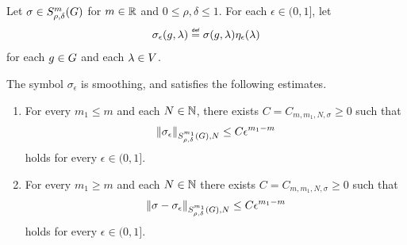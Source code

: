 \begin{corollary}
    Let $\sigma \in \SymbolClass m {\rho, \delta}$ for $m \in \R$ and $0 \leq \rho, \delta \leq 1$.
    For each $\epsilon \in (0, 1]$,
    let
    \begin{align*}
        \sigma_\epsilon(g, \lambda) \defeq \sigma(g, \lambda) \eta_\epsilon(\lambda)
    \end{align*}
    for each $g \in \Group$ and each $\lambda \in \VectorSpace$.

    The symbol $\sigma_\epsilon$ is smoothing,
    and satisfies the following estimates.
    \begin{enumerate}
        \item For every $m_1 \leq m$ and each $N \in \N$,
            there exists $C = C_{m, m_1, N, \sigma} \geq 0$ such that
            \begin{align*}
                \SymbolSemiNorm {m_1} {\rho, \delta} N {\sigma_\epsilon}
                \leq C \epsilon^{m_1 - m}
            \end{align*}
            holds for every $\epsilon \in (0, 1]$.
        \item For every $m_1 \geq m$ and each $N \in \N$
            there exists $C = C_{m, m_1, N, \sigma} \geq 0$ such that
            \begin{align*}
                \SymbolSemiNorm {m_1} {\rho, \delta} N {\sigma - \sigma_\epsilon}
                \leq C \epsilon^{m_1 - m}
            \end{align*}
            holds for every $\epsilon \in (0, 1]$.
    \end{enumerate}
\end{corollary}

